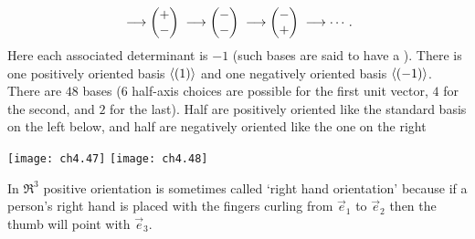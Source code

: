 \begin{exercises}
\begin{answer}
\begin{exparts}
\begin{equation*}
             \;\longrightarrow\begin{pmatrix} + \\ - \end{pmatrix}
             \;\longrightarrow\begin{pmatrix} - \\ - \end{pmatrix}
             \;\longrightarrow\begin{pmatrix} - \\ + \end{pmatrix}
             \;\longrightarrow\cdots\,.
          \end{equation*}
          Here each associated determinant is \( -1 \)
          (such bases are said to have a ).
        \partsitem There is one positively oriented basis \( \langle(1)\rangle \)
          and one negatively oriented basis \( \langle(-1)\rangle \).
        \partsitem There are \( 48 \) bases (\( 6 \) half-axis choices are
          possible for the first unit vector, \( 4 \) for the second, and
          \( 2 \) for the last).
          Half are positively oriented like the standard basis on the left 
          below,
          and half are negatively oriented like the one on the right
         \begin{center}
           \texttt{[image: ch4.47]}
           \hspace*{4em}
           \texttt{[image: ch4.48]}
          \end{center}
          In \( \Re^3 \) positive orientation is sometimes called 
          `right hand orientation' because if a person's right hand is placed
          with the fingers curling
          from \( \vec{e}_1 \) to \( \vec{e}_2 \) then the 
          thumb will point with \( \vec{e}_3 \).
      \end{exparts}  
    \end{answer}

\end{exercises}
